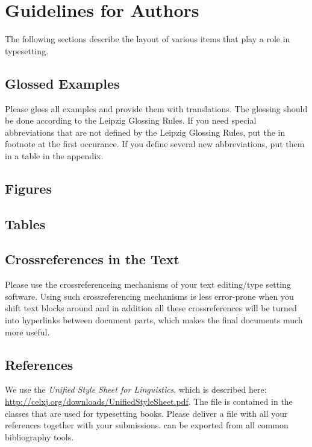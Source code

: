 \chapter{Guidelines for Authors}

The following sections describe the layout of various items that play a role in typesetting. 

\section{Glossed Examples}

Please gloss all examples and provide them with translations. The glossing should be done according
to the Leipzig Glossing Rules. If you need special abbreviations that are not defined by the Leipzig
Glossing Rules, put the in footnote at the first occurance. If you
define several new abbreviations, put them in a table in the appendix.


\section{Figures}

\section{Tables}

\section{Crossreferences in the Text}

Please use the crossreferenceing mechanisms of your text editing/type setting software. Using such
crossreferencing mechanisms is less error-prone when you shift text blocks around and in addition
all these crossreferences will be turned into hyperlinks between document parts, which makes the
final documents much more useful.

\section{References}


We use the \emph{Unified Style Sheet for Linguistics}, which is described here:
\url{http://celxj.org/downloads/UnifiedStyleSheet.pdf}. The \bibtex file is contained in the \latex
classes that are used for typesetting \lsp books. Please deliver a \bibtex file with all your
references together with your submissions. \bibtex can be exported from all common bibliography
tools.

